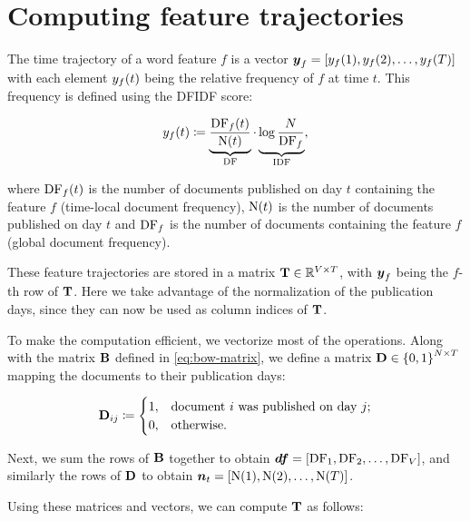 \section{Computing feature trajectories}
The time trajectory of a word feature $f$ is a vector $\vect{\traj}_{f} = \left[ \traj_{f}(1), \traj_{f}(2), \dots, \traj_{f}(\streamlen) \right]$ with each element $y_{f}(t)$ being the relative frequency of $f$ at time $t$. This frequency is defined using the DFIDF score:

\begin{equation}
	y_{f}(t) \coloneqq \underbrace{\frac{\text{DF}_{f}(t)}{\text{N}(t)}}_{\text{DF}} \cdot \underbrace{\log{\frac{N}{\text{DF}_{f}}}}_{\text{IDF}},
\end{equation}

where $\text{DF}_{f}(t)$ is the number of documents published on day $t$ containing the feature $f$ (time-local document frequency), $\text{N}(t)$ is the number of documents published on day $t$ and $\text{DF}_{f}$ is the number of documents containing the feature $f$ (global document frequency).

These feature trajectories are stored in a matrix $\mathbf{T} \in \mathbb{R}^{V \times T}$, with $\vect{\traj}_f$ being the $f$-th row of $\mathbf{T}$. Here we take advantage of the normalization of the publication days, since they can now be used as column indices of $\mathbf{T}$.

To make the computation efficient, we vectorize most of the operations. Along with the matrix $\mathbf{B}$ defined in \ref{eq:bow-matrix}, we define a matrix $\mathbf{D} \in \left\{ 0, 1 \right\}^{N \times T}$ mapping the documents to their publication days:

\begin{equation}
	\mathbf{D}_{ij} \coloneqq
	\begin{cases}
		1, & \text{document}~i~\text{was published on day}~j \text{;} \\
		0, & \text{otherwise}.
	\end{cases}
\end{equation}

Next, we sum the rows of $\mathbf{B}$ together to obtain $\vect{\df} = \left[ \text{\df}_{1}, \text{\df}_{2}, \dots, \text{\df}_{\featcount} \right]$, and similarly the rows of $\mathbf{D}$ to obtain $\vect{\doccount}_{t} = \left[ \text{\doccount}(1), \text{\doccount}(2), \dots, \text{\doccount}(\streamlen) \right]$.

Using these matrices and vectors, we can compute $\mathbf{T}$ as follows:

